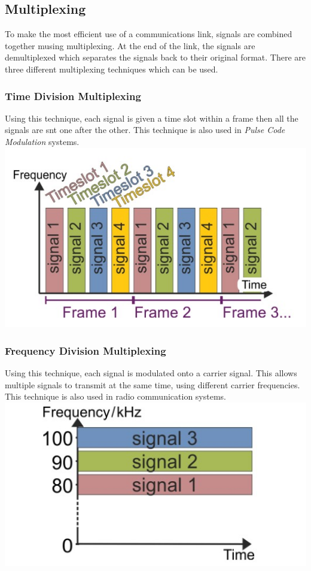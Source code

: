 \documentclass[a4paper,11pt, twocolumn]{article}
\begin{document}
\subsection{Multiplexing}
To make the most efficient use of a communications link, signals are combined together musing multiplexing. At the end of the link, the signals are demultiplexed which separates the signals back to their original format. There are three different multiplexing techniques which can be used.
\subsubsection{Time Division Multiplexing}
Using this technique, each signal is given a time slot within a frame then all the signals are snt one after the other. This technique is also used in \textit{Pulse Code Modulation} systems.
\includegraphics[width=\linewidth]{tdm.jpg}
\subsubsection{Frequency Division Multiplexing}
Using this technique, each signal is modulated onto a carrier signal. This allows multiple signals to transmit at the same time, using different carrier frequencies. This technique is also used in radio communication systems.
\includegraphics[width=\linewidth]{fdm.jpg}
\end{document}
